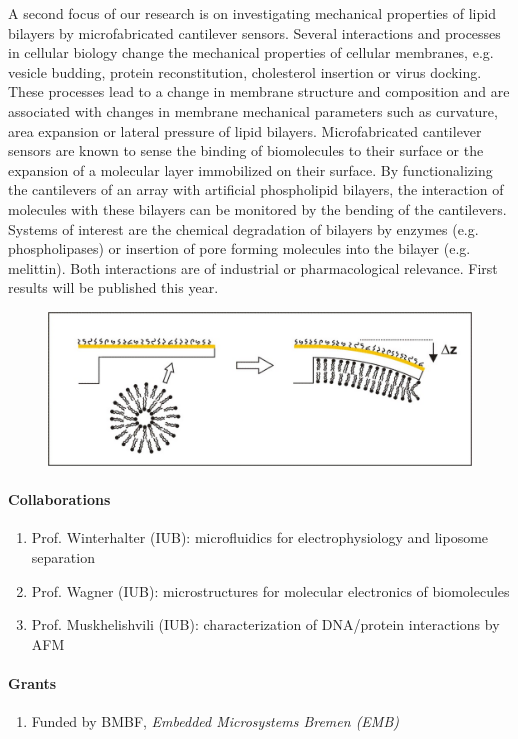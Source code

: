 A second focus of our research is on investigating mechanical properties of lipid bilayers by microfabricated cantilever sensors. Several interactions and processes in cellular biology change the mechanical properties of cellular membranes, e.g. vesicle budding, protein reconstitution, cholesterol insertion or virus docking. These processes lead to a change in membrane structure and composition and are associated with changes in membrane mechanical parameters such as curvature, area expansion or lateral pressure of lipid bilayers. Microfabricated cantilever sensors are known to sense the binding of biomolecules to their surface or the expansion of a molecular layer immobilized on their surface\cite{Fritz3}. By functionalizing the cantilevers of an array with artificial phospholipid bilayers, the interaction of molecules with these bilayers can be monitored by the bending of the cantilevers. Systems of interest are the chemical degradation of bilayers by enzymes (e.g. phospholipases) or insertion of pore forming molecules into the bilayer (e.g. melittin). Both interactions are of industrial or pharmacological relevance. First results will be published this year\cite{Fritz4}.




\begin{figure}[ht]
  \begin{center}
    \includegraphics[width=\hsize]{Fritz/ProfFritz-Fig.jpg}
    \label{fig:Fritz}
   \end{center}
\end{figure}


\paragraph{Collaborations}
\begin{enumerate}
\item Prof. Winterhalter (IUB): microfluidics for electrophysiology and liposome separation
\item Prof. Wagner (IUB): microstructures for molecular electronics of biomolecules
\item Prof. Muskhelishvili (IUB): characterization of DNA/protein interactions by AFM
\end{enumerate}

\paragraph{Grants}
\begin{enumerate}
\item Funded by BMBF, \emph{Embedded Microsystems Bremen (EMB)}
\end{enumerate}
